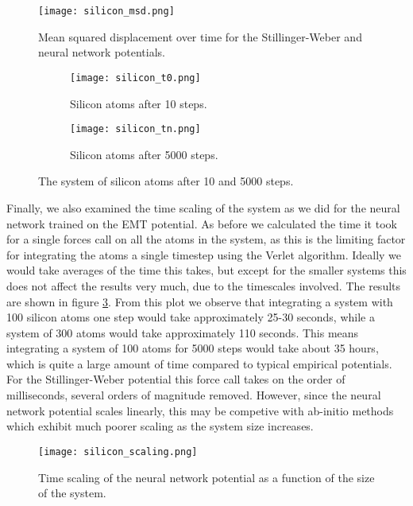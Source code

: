 \begin{figure}[H]
    \centering
    \texttt{[image: silicon\_msd.png]}
    \caption{Mean squared displacement over time for the Stillinger-Weber
        and neural network potentials.}
    \label{fig:silicon-msd}
\end{figure}

\begin{figure}[H]
\begin{adjustbox}{max width=1.2\linewidth,center}
\centering
  \begin{subfigure}[b]{0.55\textwidth}
      \texttt{[image: silicon\_t0.png]}
      \caption{Silicon atoms after 10 steps.}
  \end{subfigure}
  \hfill
  \begin{subfigure}[b]{0.55\textwidth}
      \texttt{[image: silicon\_tn.png]}
      \caption{Silicon atoms after 5000 steps.}
  \end{subfigure}
\end{adjustbox}
    \caption{The system of silicon atoms after 10 and 5000 steps.}
    \label{fig:silicon-time}
\end{figure}

Finally, we also examined the time scaling of the system as we did for the
neural network trained on the EMT potential.
As before we calculated the time it took for a single forces call
on all the atoms in the system, as this is the limiting
factor for integrating the atoms a single timestep using the
Verlet algorithm.
Ideally we would take averages of the time this takes, but except
for the smaller systems this does not affect the results very much,
due to the timescales involved.
The results are shown in figure \ref{fig:silicon-scaling}.
From this plot we observe that integrating a system
with 100 silicon atoms one step would take approximately
25-30 seconds, while a system of 300 atoms would take approximately
110 seconds. This means integrating a system of 100 atoms
for 5000 steps would take about 35 hours, which is quite
a large amount of time compared to typical empirical potentials.
For the Stillinger-Weber potential this force call
takes on the order of milliseconds, several orders of magnitude removed.
However, since the neural network potential scales linearly, this may be competive
with ab-initio methods which exhibit much poorer scaling as the system size increases.

\begin{figure}
    \centering
    \texttt{[image: silicon\_scaling.png]}
    \caption{Time scaling of the neural network potential
        as a function of the size of the system.}
    \label{fig:silicon-scaling}
\end{figure}

